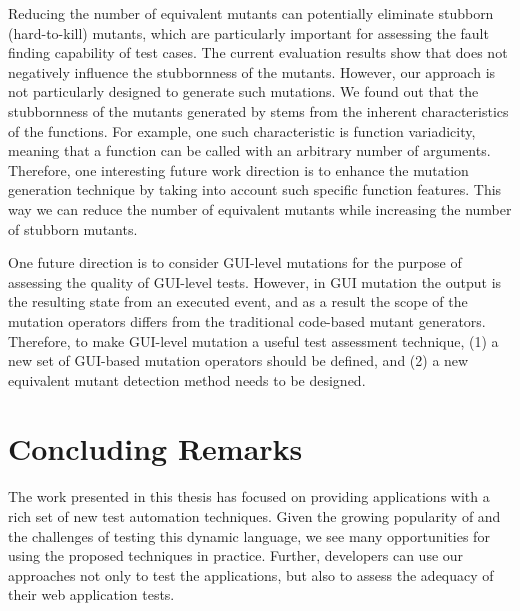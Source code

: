  Reducing the number of equivalent mutants can potentially eliminate stubborn (hard-to-kill) mutants, which are particularly important for assessing the fault finding capability of test cases. The current evaluation results show that \mutandis does not negatively influence the stubbornness of the mutants.
However, our approach is not particularly designed to generate such mutations.
We found out that the stubbornness of the mutants generated by \mutandis stems from the inherent characteristics of the \javascript functions. For example, one such characteristic is function variadicity, meaning that a function can be called with an arbitrary number of arguments. 
Therefore, one interesting future work direction is to enhance the mutation generation technique by taking into account such specific function features. This way we can reduce the number of equivalent mutants while increasing the number of stubborn mutants.

 One future direction is to consider GUI-level mutations for the purpose of assessing the quality of GUI-level tests. However, in GUI mutation the output is the resulting state from an executed event, and as a result the scope of the mutation operators differs from the traditional code-based mutant generators. Therefore, to make GUI-level mutation a useful test assessment technique, (1) a new set of GUI-based mutation operators should be defined, and (2) a new equivalent mutant detection method needs to be designed.
\section{Concluding Remarks}
The work presented in this thesis has focused on providing \javascript applications with a rich set of new test automation techniques. Given the growing popularity of \javascript and the challenges of testing this dynamic language, we see many opportunities for using the proposed techniques in practice. Further, developers can use our approaches not only to test the applications, but also to assess the adequacy of their web application tests. 
  



